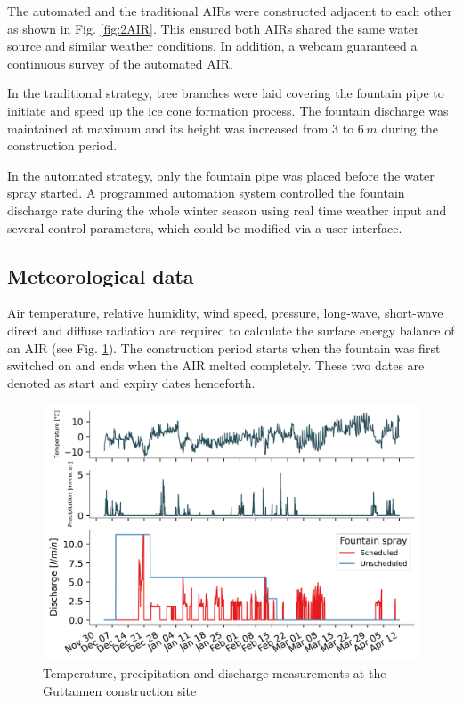 \documentclass[tc, manuscript]{copernicus}
\begin{document}
The automated and the traditional AIRs were constructed adjacent to each other as shown in Fig. \ref{fig:2AIR}.
This ensured both AIRs shared the same water source and similar weather conditions. In addition, a webcam
guaranteed a continuous survey of the automated AIR.   

In the traditional strategy, tree branches were laid covering the fountain pipe to initiate and speed up the ice
cone formation process. The fountain discharge was maintained at maximum and its height was increased from 3 to
6\,$m$ during the construction period.

In the automated strategy, only the fountain pipe was placed before the water spray started. A programmed
automation system controlled the fountain discharge rate during the whole winter season using real time weather
input and several control parameters, which could be modified via a user interface. 

\subsection{Meteorological data}

Air temperature, relative humidity, wind speed, pressure, long-wave, short-wave direct and diffuse radiation are
required to calculate the surface energy balance of an AIR (see Fig. \ref{fig:aws}). The construction period
starts when the fountain was first switched on and ends when the AIR melted completely. These two dates are denoted
as start and expiry dates henceforth.

\begin{figure}[t]
\includegraphics[width=12cm]{Figures/data.png}
\caption{Temperature, precipitation and discharge measurements at the Guttannen construction site}
\label{fig:aws} 
\end{figure}
\end{document}
